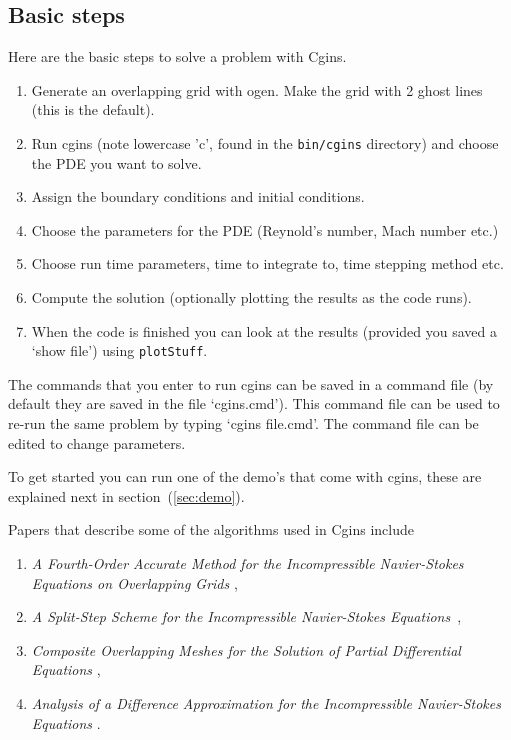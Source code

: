 \documentclass{article}
\newcommand{\Index}[1]{#1\index{#1}}
\begin{document}
\subsection{Basic steps}
Here are the basic steps to solve a problem with Cgins.
\begin{enumerate}
  \item Generate an overlapping grid with ogen. Make the grid with 2 ghost lines (this is the default).
  \item Run cgins (note lowercase 'c', found in the {\tt bin/cgins} directory) 
        and choose the PDE you want to solve.
  \item Assign the boundary conditions and initial conditions.
  \item Choose the parameters for the PDE (Reynold's number, Mach number etc.)
  \item Choose run time parameters, time to integrate to, time stepping method etc.
  \item Compute the solution (optionally plotting the results as the code runs).
  \item When the code is finished you can look at the results (provided you saved a
     `show file') using {\tt plotStuff}.
\end{enumerate}
The commands that you enter to run cgins can be saved in a \Index{command file} (by default
they are saved in the file `cgins.cmd'). This command file can be used to re-run
the same problem by typing `cgins file.cmd'. The command file can be edited to change parameters.

To get started you can run one of the demo's that come with cgins, these are 
explained next in section~(\ref{sec:demo}).

Papers that describe some of the \Index{algorithms} used in Cgins include
\begin{enumerate}
  \item {\sl A Fourth-Order Accurate Method for the Incompressible
            {N}avier-{S}tokes Equations on Overlapping Grids} \cite{ICSSI},
  \item {\em A Split-Step Scheme for the Incompressible {Navier-Stokes} Equations}~\cite{splitStep2003},
  \item {\sl Composite Overlapping Meshes for the Solution of Partial Differential Equations}
        \cite{CGNS},
  \item {\sl Analysis of a Difference Approximation for the Incompressible
            Navier-Stokes Equations} \cite{INSDIV}.
         
\end{enumerate}
\end{document}
